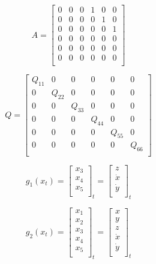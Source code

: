 \documentclass{article}
\begin{document}
\[
	A= 
	\left[ {\begin{array}{cccccc}
				0 & 0 & 0 & 1 & 0 & 0\\
				0 & 0 & 0 & 0 & 1 & 0\\
				0 & 0 & 0 & 0 & 0 & 1\\
				0 & 0 & 0 & 0 & 0 & 0\\
				0 & 0 & 0 & 0 & 0 & 0\\
				0 & 0 & 0 & 0 & 0 & 0\\
	\end{array} } \right]
\]

\[
	Q= 
	\left[ {\begin{array}{cccccc}
				Q_{11} & 0 & 0 & 0 & 0 & 0\\
				0 & Q_{22} & 0 & 0 & 0 & 0\\
				0 & 0 & Q_{33} & 0 & 0 & 0\\
				0 & 0 & 0 & Q_{44} & 0 & 0\\
				0 & 0 & 0 & 0 & Q_{55} & 0\\
				0 & 0 & 0 & 0 & 0 & Q_{66}\\
	\end{array} } \right]
\]

\[
	g_1(x_t)=
	\left[ {\begin{array}{ccc}
				x_3\\
				x_4\\
				x_5\\
	\end{array} } \right]_t
	=
	\left[ {\begin{array}{ccc}
				z\\
				\dot x\\
				\dot y\\
	\end{array} } \right]_t
\]

\[
	g_2(x_t)=
	\left[ {\begin{array}{ccccc}
				x_1\\
				x_2\\
				x_3\\
				x_4\\
				x_5\\
	\end{array} } \right]_t
	=
	\left[ {\begin{array}{ccccc}
				x\\
				y\\
				z\\
				\dot x\\
				\dot y\\
	\end{array} } \right]_t
\]
\end{document}
